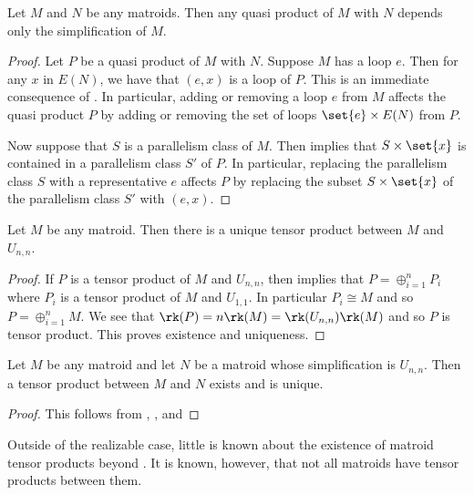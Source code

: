     \begin{lemma}\label{lem:tensorSimplification}
    Let $M$ and $N$ be any matroids. Then any quasi product of $M$ with $N$ depends only the simplification of $M$. 
    \end{lemma}
    \begin{proof}
        Let $P$ be a quasi product of $M$ with $N$. Suppose $M$ has a loop $e$. Then for any $x$ in $E(N)$, we have that $(e,x)$ is a loop of $P$. This is an immediate consequence of . In particular, adding or removing a loop $e$ from $M$ affects the quasi product $P$ by adding or removing the set of loops $\set{e}\times E(N)$ from $P$. 

        Now suppose that $S$ is a parallelism class of $M$. Then  implies that $S\times \set{x}$ is contained in a parallelism class $S'$ of $P$. In particular, replacing the parallelism class $S$ with a representative $e$ affects $P$ by replacing the subset $S\times \set{x}$ of the parallelism class $S'$ with $(e,x)$. 
    \end{proof}
\begin{proposition}\label{prop:uniqueTensors}
Let $M$ be any matroid. Then there is a unique tensor product between $M$ and $U_{n,n}$.
\end{proposition}
    \begin{proof}
            If $P$ is a tensor product of $M$ and $U_{n,n}$, then  implies that $P = \oplus_{i=1}^n P_i$ where $P_i$ is a tensor product of $M$ and $U_{1,1}$. In particular $P_i\cong M$ and so $P=\oplus_{i=1}^n M$. We see that $\rk(P)=n\rk(M)=\rk(U_{n,n})\rk(M)$ and so $P$ is tensor product. This proves existence and uniqueness.
    \end{proof}

    \begin{corollary}\label{cor:uniqueSimplification}
        Let $M$ be any matroid and let $N$ be a matroid whose simplification is $U_{n,n}$. Then a tensor product between $M$ and $N$ exists and is unique.
    \end{corollary}
    \begin{proof}
    This follows from , , and 
    \end{proof}
 
    Outside of the realizable case, little is known about the existence of matroid tensor products beyond . It is known, however, that not all matroids have tensor products between them. 
    
